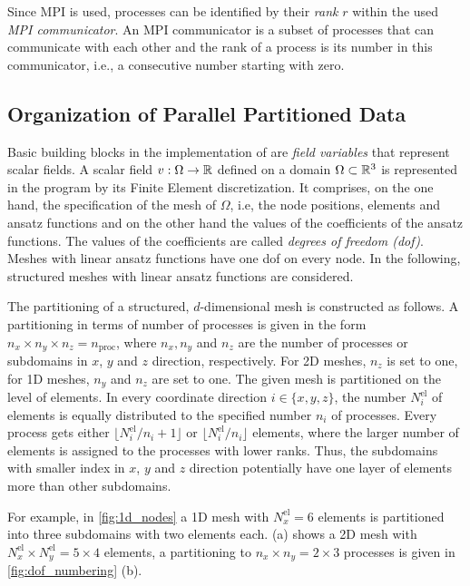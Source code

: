 Since MPI is used, processes can be identified by their \emph{rank} $r$ within the used \emph{MPI communicator}. An MPI communicator is a subset of processes that can communicate with each other and the rank of a process is its number in this communicator, i.e., a consecutive number starting with zero.

\subsection{Organization of Parallel Partitioned Data}\label{sec:oragnization_of_parallel_partitioned_data}

Basic building blocks in the implementation of \opendihu{} are \emph{field variables} that represent scalar fields.
A scalar field $v : \Omega \to \mathbb{R}$ defined on a domain $\Omega \subset \mathbb{R}^3$ is represented in the program by its Finite Element discretization. It comprises, on the one hand, the specification of the mesh of $\Omega$, i.e, the node positions, elements and ansatz functions and on the other hand the values of the coefficients of the ansatz functions. The values of the coefficients are called \emph{degrees of freedom (dof)}. Meshes with linear ansatz functions have one dof on every node. In the following, structured meshes with linear ansatz functions are considered.

The partitioning of a structured, $d$-dimensional mesh is constructed as follows. A partitioning in terms of number of processes is given in the form $n_x \times n_y \times n_z = n_\text{proc}$, where $n_x,n_y$ and $n_z$ are the number of processes or subdomains in $x$, $y$ and $z$ direction, respectively. For 2D meshes, $n_z$ is set to one, for 1D meshes, $n_y$ and $n_z$ are set to one. The given mesh is partitioned on the level of elements. In every coordinate direction $i \in \{x,y,z\}$, the number $N^\text{el}_i$ of elements is equally distributed to the specified number $n_i$ of processes. Every process gets either $\lfloor N^\text{el}_i/n_i+1\rfloor$ or $\lfloor N^\text{el}_i/n_i \rfloor$ elements, where the larger number of elements is assigned to the processes with lower ranks. Thus, the subdomains with smaller index in $x$, $y$ and $z$ direction potentially have one layer of elements more than other subdomains.

For example, in \cref{fig:1d_nodes} a 1D mesh with $N^\text{el}_x=6$ elements is partitioned into three subdomains with two elements each. 
 (a) shows a 2D mesh with $N^\text{el}_x \times N^\text{el}_y = 5 \times 4$ elements, a partitioning to $n_x \times n_y = 2 \times 3$ processes is given in \cref{fig:dof_numbering} (b).

